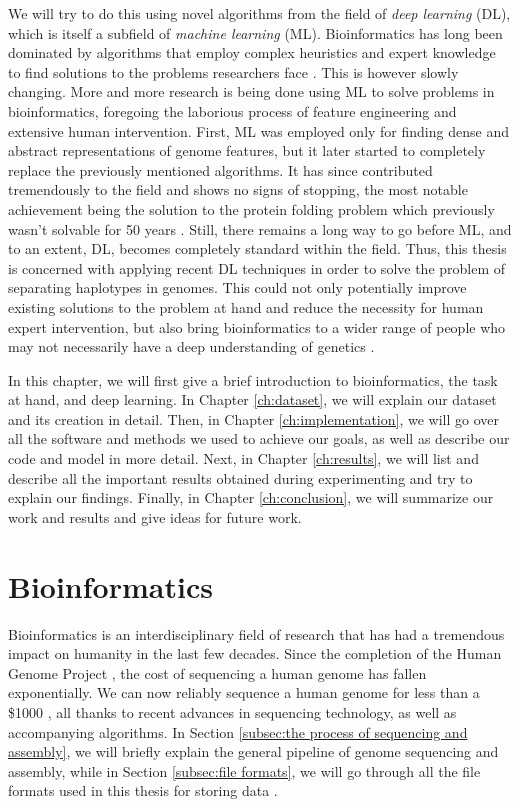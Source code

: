\documentclass[times, utf8, diplomski, english]{fer_eng}
\begin{document}
We will try to do this using novel algorithms from the field of \textit{deep learning} (DL), which is itself a subfield of \textit{machine learning} (ML). Bioinformatics has long been dominated by algorithms that employ complex heuristics and expert knowledge to find solutions to the problems researchers face \cite{compeau_pevzner_2015}. This is however slowly changing. More and more research is being done using ML to solve problems in bioinformatics, foregoing the laborious process of feature engineering and extensive human intervention. First, ML was employed only for finding dense and abstract representations of genome features, but it later started to completely replace the previously mentioned algorithms. It has since contributed tremendously to the field and shows no signs of stopping, the most notable achievement being the solution to the protein folding problem which previously wasn't solvable for 50 years \cite{alphafold}. Still, there remains a long way to go before ML, and to an extent, DL, becomes completely standard within the field. Thus, this thesis is concerned with applying recent DL techniques in order to solve the problem of separating haplotypes in genomes. This could not only potentially improve existing solutions to the problem at hand and reduce the necessity for human expert intervention, but also bring bioinformatics to a wider range of people who may not necessarily have a deep understanding of genetics \cite{dl_bioinformatics}.

In this chapter, we will first give a brief introduction to bioinformatics, the task at hand, and deep learning. In Chapter \ref{ch:dataset}, we will explain our dataset and its creation in detail. Then, in Chapter \ref{ch:implementation}, we will go over all the software and methods we used to achieve our goals, as well as describe our code and model in more detail. Next, in Chapter \ref{ch:results}, we will list and describe all the important results obtained during experimenting and try to explain our findings. Finally, in Chapter \ref{ch:conclusion}, we will summarize our work and results and give ideas for future work.

\section{Bioinformatics}

Bioinformatics is an interdisciplinary field of research that has had a tremendous impact on humanity in the last few decades. Since the completion of the Human Genome Project \cite{HGP1} \cite{HGP2}, the cost of sequencing a human genome has fallen exponentially. We can now reliably sequence a human genome for less than a \$1000 \cite{genome_cost}, all thanks to recent advances in sequencing technology, as well as accompanying algorithms. In Section \ref{subsec:the process of sequencing and assembly}, we will briefly explain the general pipeline of genome sequencing and assembly, while in Section \ref{subsec:file formats}, we will go through all the file formats used in this thesis for storing data	.
\end{document}
